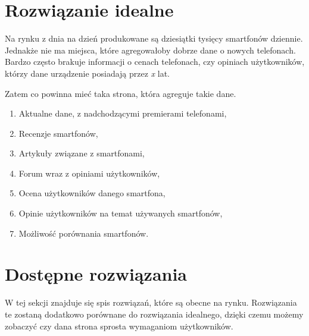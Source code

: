 \section{Rozwiązanie idealne}\label{ideal_solution}
Na rynku z dnia na dzień produkowane są dziesiątki tysięcy smartfonów dziennie. Jednakże nie ma miejsca, które agregowałoby dobrze dane o nowych telefonach. Bardzo często brakuje informacji o cenach telefonach, czy opiniach użytkowników, którzy dane urządzenie posiadają przez \textit{x} lat.

Zatem co powinna mieć taka strona, która agreguje takie dane.
\begin{enumerate}
    \item Aktualne dane, z nadchodzącymi premierami telefonami,
    \item Recenzje smartfonów,
    \item Artykuły związane z smartfonami,
    \item Forum wraz z opiniami użytkowników,
    \item Ocena użytkowników danego smartfona,
    \item Opinie użytkowników na temat używanych smartfonów,
    \item Możliwość porównania smartfonów.
\end{enumerate}

\section{Dostępne rozwiązania}
W tej sekcji znajduje się spis rozwiązań, które są obecne na rynku. Rozwiązania te zostaną dodatkowo porównane do rozwiązania idealnego, dzięki czemu możemy zobaczyć czy dana strona sprosta wymaganiom użytkowników.

